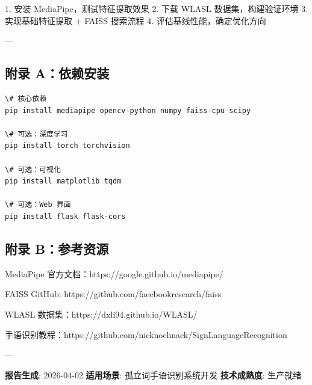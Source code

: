 \documentclass[a4paper,12pt]{article}
\begin{document}
1. 安装 MediaPipe，测试特征提取效果
2. 下载 WLASL 数据集，构建验证环境
3. 实现基础特征提取 + FAISS 搜索流程
4. 评估基线性能，确定优化方向

---

\subsection{附录 A：依赖安装}

\begin{verbatim}
\# 核心依赖
pip install mediapipe opencv-python numpy faiss-cpu scipy

\# 可选：深度学习
pip install torch torchvision

\# 可选：可视化
pip install matplotlib tqdm

\# 可选：Web 界面
pip install flask flask-cors
\end{verbatim}


\subsection{附录 B：参考资源}

\item MediaPipe 官方文档：https://google.github.io/mediapipe/
\item FAISS GitHub: https://github.com/facebookresearch/faiss
\item WLASL 数据集：https://dxli94.github.io/WLASL/
\item 手语识别教程：https://github.com/nicknochnack/SignLanguageRecognition

---

\textbf{报告生成}: 2026-04-02  
\textbf{适用场景}: 孤立词手语识别系统开发  
\textbf{技术成熟度}: 生产就绪
\end{document}

